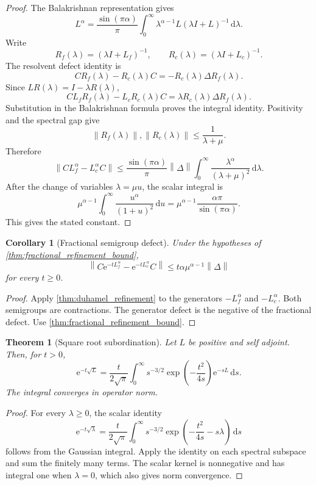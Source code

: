 \documentclass{aomart}
\newtheorem{theorem}{Theorem}[section]
\newtheorem{corollary}[corollary]{Corollary}
\theoremstyle{definition}
\theoremstyle{remark}
\newcommand{\e}{\mathrm e}
\newcommand{\dd}{\,\mathrm d}
\newcommand{\norm}[1]{\left\lVert#1\right\rVert}
\begin{document}
\begin{proof}
The Balakrishnan representation \cite{Balakrishnan1960} gives
\[
L^\alpha
=
\frac{\sin(\pi\alpha)}{\pi}
\int_0^\infty
\lambda^{\alpha-1}L(\lambda I+L)^{-1}
\dd\lambda.
\]
Write
\[
R_f(\lambda)=(\lambda I+L_f)^{-1},
\qquad
R_c(\lambda)=(\lambda I+L_c)^{-1}.
\]
The resolvent defect identity is
\[
CR_f(\lambda)-R_c(\lambda)C
=
-R_c(\lambda)\Delta R_f(\lambda).
\]
Since \(LR(\lambda)=I-\lambda R(\lambda)\),
\[
CL_fR_f(\lambda)-L_cR_c(\lambda)C
=
\lambda R_c(\lambda)\Delta R_f(\lambda).
\]
Substitution in the Balakrishnan formula proves the integral identity. Positivity and the spectral gap give
\[
\norm{R_f(\lambda)},\norm{R_c(\lambda)}
\leq
\frac1{\lambda+\mu}.
\]
Therefore
\[
\norm{CL_f^\alpha-L_c^\alpha C}
\leq
\frac{\sin(\pi\alpha)}{\pi}
\norm{\Delta}
\int_0^\infty
\frac{\lambda^\alpha}{(\lambda+\mu)^2}
\dd\lambda.
\]
After the change of variables \(\lambda=\mu u\), the scalar integral is
\[
\mu^{\alpha-1}
\int_0^\infty\frac{u^\alpha}{(1+u)^2}\dd u
=
\mu^{\alpha-1}
\frac{\alpha\pi}{\sin(\pi\alpha)}.
\]
This gives the stated constant.
\end{proof}

\begin{corollary}[Fractional semigroup defect]\label{cor:fractional_semigroup_defect}
Under the hypotheses of \cref{thm:fractional_refinement_bound},
\[
\boxed{
\norm{C\e^{-tL_f^\alpha}
-\e^{-tL_c^\alpha}C}
\leq
 t\alpha\mu^{\alpha-1}\norm{\Delta}
}
\]
for every \(t\geq0\).
\end{corollary}

\begin{proof}
Apply \cref{thm:duhamel_refinement} to the generators \(-L_f^\alpha\) and \(-L_c^\alpha\). Both semigroups are contractions. The generator defect is the negative of the fractional defect. Use \cref{thm:fractional_refinement_bound}.
\end{proof}

\begin{theorem}[Square root subordination]\label{thm:square_root_subordination}
Let \(L\) be positive and self adjoint. Then, for \(t>0\),
\[
\boxed{
\e^{-t\sqrt L}
=
\frac{t}{2\sqrt\pi}
\int_0^\infty
s^{-3/2}
\exp\left(-\frac{t^2}{4s}\right)
\e^{-sL}
\dd s.
}
\]
The integral converges in operator norm.
\end{theorem}

\begin{proof}
For every \(\lambda\geq0\), the scalar identity
\[
\e^{-t\sqrt\lambda}
=
\frac{t}{2\sqrt\pi}
\int_0^\infty
s^{-3/2}
\exp\left(-\frac{t^2}{4s}-s\lambda\right)
\dd s
\]
follows from the Gaussian integral. Apply the identity on each spectral subspace and sum the finitely many terms. The scalar kernel is nonnegative and has integral one when \(\lambda=0\), which also gives norm convergence.
\end{proof}
\end{document}
